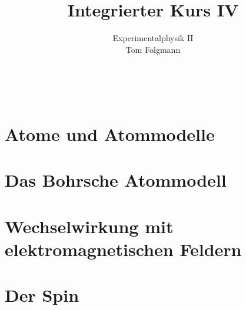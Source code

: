 \documentclass{article}
\title{Integrierter Kurs IV}
\author{Experimentalphysik II\\Tom Folgmann}
\begin{document}
    \maketitle
    \tableofcontents
    \thispagestyle{empty}
    \newpage
    \ 
    \thispagestyle{empty}
    \newpage

    \section{Atome und Atommodelle}
        
        
        
        
        
        
        
        
        

        \newpage
        

    
    \clearpage
    \thispagestyle{empty}
    \cleardoublepage{}
    \section{Das Bohrsche Atommodell}
        

        
        

    \clearpage
    \thispagestyle{empty}
    \cleardoublepage{}
    
    \section{Wechselwirkung mit elektromagnetischen Feldern}\label{sec:WWmeFeldern}
        

        
        

        
        
        
        
    \clearpage
    \thispagestyle{empty}
    \cleardoublepage{}
    \section{Der Spin}\label{sec:Spin}
        
        
        
\end{document}
